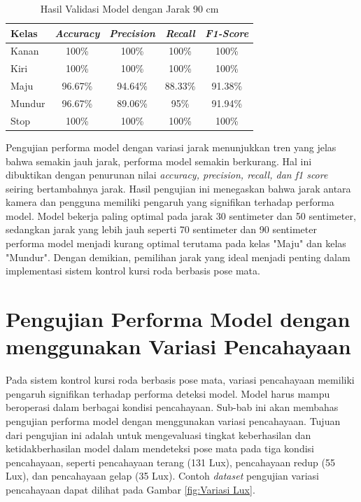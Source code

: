 \begin{longtable}{|l|c|c|c|c|}
  \caption{Hasil Validasi Model dengan Jarak 90 cm}
  \label{tb:vs_model6} \\
  \hline
  \rowcolor[HTML]{C0C0C0} 
  \textbf{Kelas} & \textbf{\emph{Accuracy}} & \textbf{\emph{Precision}} & \textbf{\emph{Recall}} & \textbf{\emph{F1-Score}} \\ \hline
  Kanan    & 100\%            & 100\%             & 100\%           & 100\%            \\ \hline
  Kiri     & 100\%          & 100\%           & 100\%           & 100\%           \\ \hline
  Maju      & 96.67\%          & 94.64\%           & 88.33\%          & 91.38\%          \\ \hline
  Mundur     & 96.67\%            & 89.06\%             & 95\%           & 91.94\%            \\ \hline
  Stop  & 100\%            & 100\%             & 100\%           & 100\%            \\ \hline
\end{longtable}

Pengujian performa model dengan variasi jarak menunjukkan tren yang jelas bahwa semakin jauh jarak, performa model semakin berkurang. Hal ini dibuktikan dengan penurunan nilai \emph{accuracy, precision, recall, dan f1 score} seiring bertambahnya jarak. Hasil pengujian ini menegaskan bahwa jarak antara kamera dan pengguna memiliki pengaruh yang signifikan terhadap performa model. Model bekerja paling optimal pada jarak 30 sentimeter dan 50 sentimeter, sedangkan jarak yang lebih jauh seperti 70 sentimeter dan 90 sentimeter performa model menjadi kurang optimal terutama pada kelas "Maju" dan kelas "Mundur". Dengan demikian, pemilihan jarak yang ideal menjadi penting dalam implementasi sistem kontrol kursi roda berbasis pose mata.

\section{Pengujian Performa Model dengan menggunakan Variasi Pencahayaan}

Pada sistem kontrol kursi roda berbasis pose mata, variasi pencahayaan memiliki pengaruh signifikan terhadap performa deteksi model. Model harus mampu beroperasi dalam berbagai kondisi pencahayaan. Sub-bab ini akan membahas pengujian performa model dengan menggunakan variasi pencahayaan. Tujuan dari pengujian ini adalah untuk mengevaluasi tingkat keberhasilan dan ketidakberhasilan model dalam mendeteksi pose mata pada tiga kondisi pencahayaan, seperti pencahayaan terang (131 Lux), pencahayaan redup (55 Lux), dan pencahayaan gelap (35 Lux). Contoh \emph{dataset} pengujian variasi pencahayaan dapat dilihat pada Gambar \ref{fig:Variasi Lux}.

